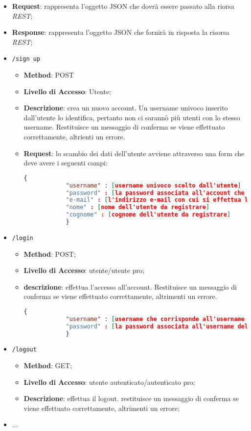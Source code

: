 \begin{itemize}
	\item \textbf{Request}: rappresenta l'oggetto JSON che dovrà essere passato alla riorsa \textit{REST};
	\item \textbf{Response}: rappresenta l'oggetto JSON che fornirà in risposta la risorsa \textit{REST};
	\item \texttt{/sign up}
		\begin{itemize}
			\item \textbf{Method}: POST
			\item \textbf{Livello di Accesso}: Utente;
			\item \textbf{Descrizione}: crea un nuovo account. Un username univoco inserito dall'utente lo identifica, pertanto non ci sarannò più utenti con lo stesso username. Restituisce un messaggio di conferma se viene effettuato correttamente, altrienti un errore.
			\item \textbf{Request}: lo scambio dei dati dell'utente avviene attraverso una form che deve avere i seguenti campi:
			\begin{lstlisting}[language=json,firstnumber=1]
			{
			"username" : [username univoco scelto dall'utente]
			"password" : [la password associata all'account che si vuole registrare]
			"e-mail" : [l'indirizzo e-mail con cui si effettua la registrazione]
			"nome" : [nome dell'utente da registrare]
			"cognome" : [cognome dell'utente da registrare]
			}
			\end{lstlisting}
		\end{itemize}
	\item \texttt{/login}
		\begin{itemize}
			\item \textbf{Method}: POST;
			\item \textbf{Livello di Accesso}: utente/utente pro;
			\item \textbf{descrizione}: effettua l'accesso all'account. Restituisce un messaggio di conferma se viene effettuato correttamente, altrimenti un errore.
			\begin{lstlisting}[language=json,firstnumber=1]
			{
			"username" : [username che corrisponde all'username inserita durante la registrazione]
			"password" : [la password associata all'username dell'account dell'utente]
			}
			\end{lstlisting}
		\end{itemize}
	\item \texttt{/logout}
		\begin{itemize}
			\item \textbf{Method}: GET;
			\item \textbf{Livello di Accesso}: utente autenticato/autenticato pro;
			\item \textbf{Descrizione}: effettua il logout. restituisce un messaggio di conferma se viene effettuato correttamente, altrimenti un errore;
		\end{itemize}
	\item ...
\end{itemize}